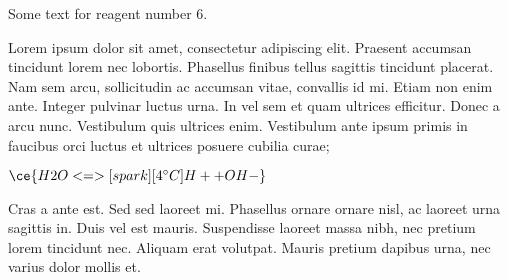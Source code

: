 
Some text for reagent number 6.

Lorem ipsum dolor sit amet, consectetur adipiscing elit. Praesent accumsan tincidunt lorem nec lobortis. Phasellus finibus tellus sagittis tincidunt placerat. Nam sem arcu, sollicitudin ac accumsan vitae, convallis id mi. Etiam non enim ante. Integer pulvinar luctus urna. In vel sem et quam ultrices efficitur. Donec a arcu nunc. Vestibulum quis ultrices enim. Vestibulum ante ipsum primis in faucibus orci luctus et ultrices posuere cubilia curae;

$\ce{H2O <=>[spark][4^\circ C] H+ + OH-}$

Cras a ante est. Sed sed laoreet mi. Phasellus ornare ornare nisl, ac laoreet urna sagittis in. Duis vel est mauris. Suspendisse laoreet massa nibh, nec pretium lorem tincidunt nec. Aliquam erat volutpat. Mauris pretium dapibus urna, nec varius dolor mollis et.
